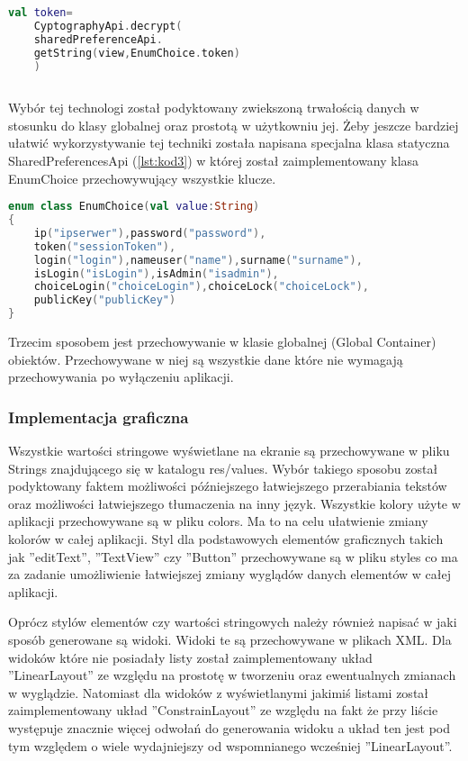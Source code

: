 		\begin{lstlisting}[caption={fragment kodu odpowiedzialny za odczytanie tokena.}, label={lst:kod2}, language=Kotlin]
	val token=
	CyptographyApi.decrypt( 
	sharedPreferenceApi.
	getString(view,EnumChoice.token)
	)
	
	\end{lstlisting}
		Wybór tej technologi został podyktowany zwiekszoną trwałością danych w stosunku do klasy globalnej oraz prostotą w użytkowniu jej. Żeby jeszcze bardziej ułatwić wykorzystywanie tej techniki została napisana specjalna klasa statyczna SharedPreferencesApi (\ref{lst:kod3}) w której został zaimplementowany klasa EnumChoice przechowywujący wszystkie klucze.
	
		\begin{lstlisting}[caption={klasa EnumChoice.}, label={lst:kod3}, language=Kotlin]
enum class EnumChoice(val value:String)
{
	ip("ipserwer"),password("password"),
	token("sessionToken"),
	login("login"),nameuser("name"),surname("surname"),
	isLogin("isLogin"),isAdmin("isadmin"),
	choiceLogin("choiceLogin"),choiceLock("choiceLock"),
	publicKey("publicKey")
}

		\end{lstlisting}
		
		Trzecim sposobem jest przechowywanie w klasie globalnej (Global Container)  obiektów. Przechowywane w niej są wszystkie dane które nie wymagają przechowywania po wyłączeniu aplikacji.
		
		\subsubsection{Implementacja graficzna}
		
		Wszystkie wartości stringowe wyświetlane na ekranie są przechowywane w pliku Strings znajdującego się w katalogu res/values. Wybór takiego sposobu został podyktowany faktem możliwości późniejszego łatwiejszego przerabiania tekstów oraz możliwości łatwiejszego tłumaczenia na inny język. Wszystkie kolory użyte w aplikacji przechowywane są w pliku colors. Ma to na celu ułatwienie  zmiany kolorów w całej aplikacji. Styl dla podstawowych elementów graficznych takich jak ''editText'', ''TextView'' czy ''Button'' przechowywane są w pliku styles co ma za zadanie umożliwienie łatwiejszej zmiany wyglądów danych elementów w całej aplikacji.
		
		Oprócz stylów elementów czy wartości stringowych należy również napisać w jaki sposób generowane są widoki. Widoki te są przechowywane w plikach XML.  Dla widoków które nie posiadały listy został zaimplementowany układ ''LinearLayout'' ze względu na prostotę w tworzeniu oraz ewentualnych zmianach w wyglądzie. Natomiast dla widoków z wyświetlanymi jakimiś listami został zaimplementowany układ ''ConstrainLayout'' ze względu na fakt że przy liście występuje znacznie więcej odwołań do generowania widoku a układ ten jest pod tym względem o wiele wydajniejszy od wspomnianego wcześniej ''LinearLayout''. 
		
